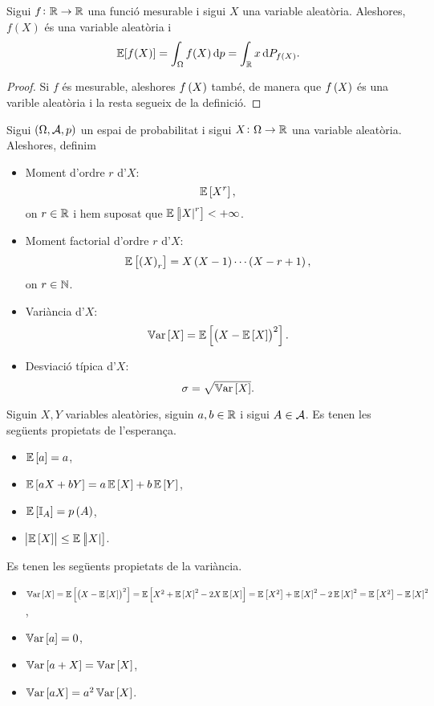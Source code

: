 \begin{prop}
    Sigui $f\colon\mathbb{R}\to\mathbb{R}$ una funció mesurable i sigui $X$ una variable aleatòria. Aleshores, $f(X)$ és una variable aleatòria i
    \[
        \esp[f(X)] = \int_{\Omega}{f(X) \dif p} = \int_\real{x \dif P_{f\lp X\rp}}.
    \]
\end{prop}
\begin{proof}
    Si $f$ és mesurable, aleshores $f\left( X\right)$ també, de manera que $f\left( X\right)$ és una varible aleatòria i la resta segueix de la definició.
\end{proof}

\begin{defi}
    Sigui $\left(\Omega,\mathcal{A},p\right)$ un espai de probabilitat i sigui $X\colon\Omega\to\mathbb{R}$ una variable aleatòria. Aleshores, definim
    \begin{itemize}
        \item Moment d'ordre $r$ d'$X$: 
            \[
                \operatorname{\mathbb{E}}\left[ X^r\right],
            \]
            on $r\in\mathbb{R}$ i hem suposat que $\operatorname{\mathbb{E}}\left[\abs{X}^r\right]<+\infty$.
        \item Moment factorial d'ordre $r$ d'$X$: 
            \[
                \operatorname{\mathbb{E}}\left[ \left( X\right)_r\right]=X\left( X-1\right)\cdots\left( X-r+1\right),
            \]
            on $r\in\mathbb{N}$.
        \item Variància d'$X$:
            \[
                \operatorname{\mathbb{V}ar}\left[ X\right]=\operatorname{\mathbb{E}}\left[\left( X-\operatorname{\mathbb{E}}\left[ X\right]\right)^2\right].
            \]
        \item Desviació típica d'$X$:
            \[
                \sigma=\sqrt{\operatorname{\mathbb{V}ar}\left[ X\right]}.
            \]
    \end{itemize}
\end{defi}

\begin{prop}
    Siguin $X, Y$ variables aleatòries, siguin $a, b\in\mathbb{R}$ i sigui $A\in\mathcal{A}$. Es tenen les següents propietats de l'esperança.
    \begin{itemize}
        \item $\operatorname{\mathbb{E}}\left[ a\right]=a$,
        \item $\operatorname{\mathbb{E}}\left[ aX+bY\right]=a\operatorname{\mathbb{E}}\left[ X\right]+b\operatorname{\mathbb{E}}\left[ Y\right]$,
        \item $\operatorname{\mathbb{E}}\left[ \mathbb{I}_A\right]=p\left( A\right)$,
        \item $\abs{\operatorname{\mathbb{E}}\left[ X\right]}\leq\operatorname{\mathbb{E}}\left[\abs{X}\right]$.
    \end{itemize}
    Es tenen les següents propietats de la variància.
    \begin{itemize}
        \item $\operatorname{\mathbb{V}ar}\left[ X\right]=\operatorname{\mathbb{E}}\left[\left( X-\operatorname{\mathbb{E}}\left[ X\right]\right)^2\right]=\operatorname{\mathbb{E}}\left[ X^2+\operatorname{\mathbb{E}}\left[ X\right]^2-2X\operatorname{\mathbb{E}}\left[ X\right]\right]=\operatorname{\mathbb{E}}\left[ X^2\right]+\operatorname{\mathbb{E}}\left[ X\right]^2-2\operatorname{\mathbb{E}}\left[ X\right]^2=\operatorname{\mathbb{E}}\left[ X^2\right]-\operatorname{\mathbb{E}}\left[ X\right]^2$,
        \item $\operatorname{\mathbb{V}ar}\left[ a\right]=0$,
        \item $\operatorname{\mathbb{V}ar}\left[ a+X\right]=\operatorname{\mathbb{V}ar}\left[ X\right]$,
        \item $\operatorname{\mathbb{V}ar}\left[ aX\right]=a^2\operatorname{\mathbb{V}ar}\left[ X\right]$.
    \end{itemize}
\end{prop}

